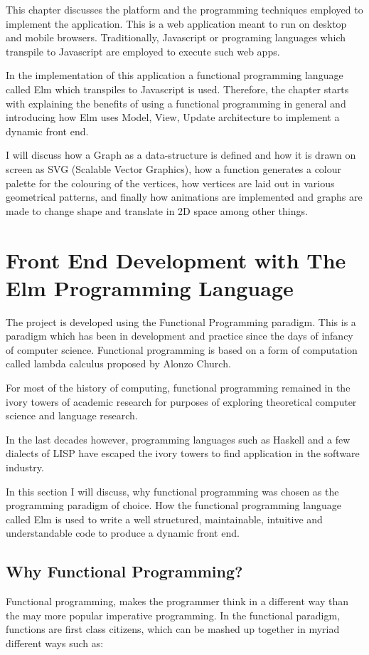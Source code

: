 \graphicspath{ {images/} }

This chapter discusses the platform and the programming techniques employed to
implement the application.  This is a web application meant to run
on desktop and mobile browsers. Traditionally, Javascript or programing languages which transpile
to Javascript are employed to execute such web apps. 

In the implementation of this application a functional programming language
called Elm which transpiles to Javascript is used. Therefore, the chapter
starts with explaining the benefits of using a functional programming in general
and introducing how Elm uses Model, View, Update architecture to implement a dynamic
front end.

I will discuss how a Graph as a
data-structure is defined and how it is drawn on screen as SVG (Scalable Vector
Graphics), how a function generates a colour palette for the colouring of the
vertices, how vertices are laid out in various geometrical patterns, and finally how
animations are implemented and graphs are made to change shape and translate in
2D space among other things.


\section{Front End Development with The Elm Programming Language}

The project is developed using the Functional Programming paradigm. This is a
paradigm which has been in development and practice since the days of infancy
of computer science. Functional programming is based on a form of computation
called lambda calculus proposed by Alonzo Church. \cite{Hudak2007}

For most of the history of computing, functional programming remained in the
ivory towers of academic research for purposes of exploring theoretical computer
science and language research.

In the last decades however, programming languages such as Haskell and a few
dialects of LISP have escaped the ivory towers to find application in the
software industry.

In this section I will discuss, why functional programming was chosen as the
programming paradigm of choice. How the functional programming language called
Elm is used to write a well structured, maintainable, intuitive and
understandable code to produce a dynamic front end.

\subsection{Why Functional Programming?}
Functional programming, makes the programmer think in a different way than the
may more popular imperative programming. In the functional paradigm, functions are
first class citizens, which can be mashed up together in myriad different ways
such as:


